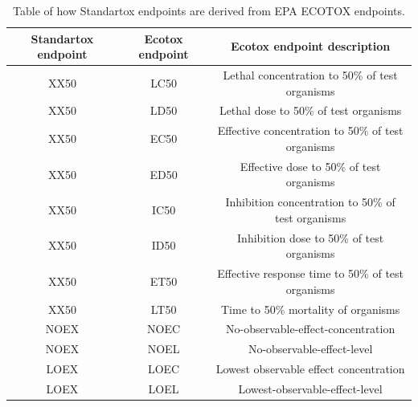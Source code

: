 \documentclass[journal,datadescriptor,accept,moreauthors,pdftex]{Definitions/mdpi}
\begin{document}
\begin{table}[H]
    \caption{Table of how Standartox endpoints are derived from EPA ECOTOX endpoints.}
    \label{tab:endpoints-conflate}
    \centering
\begin{tabular}{ccc}
    \toprule
    \textbf{Standartox endpoint} & \textbf{Ecotox endpoint} & \textbf{Ecotox endpoint description} \\
    \midrule
    XX50 & LC50 & Lethal concentration to 50\% of test organisms \\
    XX50 & LD50 & Lethal dose to 50\% of test organisms \\
    XX50 & EC50 & Effective concentration to 50\% of test organisms \\
    XX50 & ED50 & Effective dose to 50\% of test organisms \\
    XX50 & IC50 & Inhibition concentration to 50\% of test organisms \\
    XX50 & ID50 & Inhibition dose to 50\% of test organisms \\
    XX50 & ET50 & Effective response time to 50\% of test organisms \\
    XX50 & LT50 & Time to 50\% mortality of organisms \\
    NOEX & NOEC & No-observable-effect-concentration \\
    NOEX & NOEL & No-observable-effect-level \\
    LOEX & LOEC & Lowest observable effect concentration\\
    LOEX & LOEL & Lowest-observable-effect-level \\
    \bottomrule
\end{tabular}
\end{table}
\end{document}
